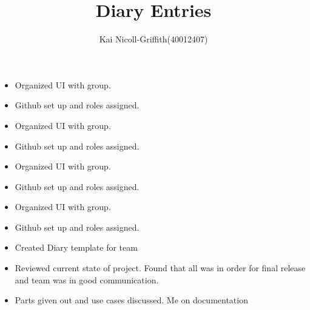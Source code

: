 \documentclass{article}
\title{Diary Entries}
\author{Kai Nicoll-Griffith(40012407)}
\begin{document}
	\maketitle
	
	\begin{itemize}
		\item Organized UI with group.  
		\item Github set up and roles assigned.
	\end{itemize}

	\begin{itemize}
		\item Organized UI with group.  
		\item Github set up and roles assigned.
	\end{itemize}

	\begin{itemize}
		\item Organized UI with group.  
		\item Github set up and roles assigned.
	\end{itemize}

	\begin{itemize}
		\item Organized UI with group.  
		\item Github set up and roles assigned.
	\end{itemize}
	\begin{itemize}
		\item Created Diary template for team
	\end{itemize}
	\begin{itemize}
		\item Reviewed current state of project. Found that all was in order for final release and team was in good communication. 
	\end{itemize}	

	\begin{itemize}
		\item Parts given out and use cases discussed. Me on documentation
	\end{itemize}
\end{document}
